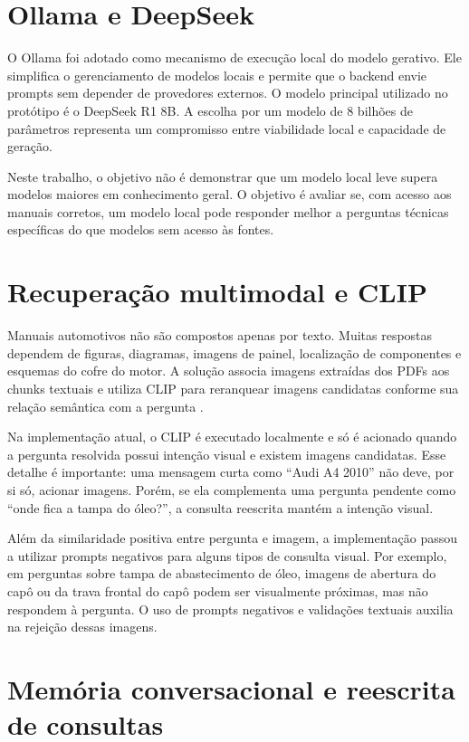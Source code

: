 \section{Ollama e DeepSeek}

O Ollama foi adotado como mecanismo de execução local do modelo gerativo. Ele simplifica o gerenciamento de modelos locais e permite que o backend envie prompts sem depender de provedores externos. O modelo principal utilizado no protótipo é o DeepSeek R1 8B. A escolha por um modelo de 8 bilhões de parâmetros representa um compromisso entre viabilidade local e capacidade de geração.

Neste trabalho, o objetivo não é demonstrar que um modelo local leve supera modelos maiores em conhecimento geral. O objetivo é avaliar se, com acesso aos manuais corretos, um modelo local pode responder melhor a perguntas técnicas específicas do que modelos sem acesso às fontes.

\section{Recuperação multimodal e CLIP}

Manuais automotivos não são compostos apenas por texto. Muitas respostas dependem de figuras, diagramas, imagens de painel, localização de componentes e esquemas do cofre do motor. A solução associa imagens extraídas dos PDFs aos chunks textuais e utiliza CLIP para reranquear imagens candidatas conforme sua relação semântica com a pergunta \cite{radford2021clip}.

Na implementação atual, o CLIP é executado localmente e só é acionado quando a pergunta resolvida possui intenção visual e existem imagens candidatas. Esse detalhe é importante: uma mensagem curta como ``Audi A4 2010'' não deve, por si só, acionar imagens. Porém, se ela complementa uma pergunta pendente como ``onde fica a tampa do óleo?'', a consulta reescrita mantém a intenção visual.

Além da similaridade positiva entre pergunta e imagem, a implementação passou a utilizar prompts negativos para alguns tipos de consulta visual. Por exemplo, em perguntas sobre tampa de abastecimento de óleo, imagens de abertura do capô ou da trava frontal do capô podem ser visualmente próximas, mas não respondem à pergunta. O uso de prompts negativos e validações textuais auxilia na rejeição dessas imagens.

\section{Memória conversacional e reescrita de consultas}

